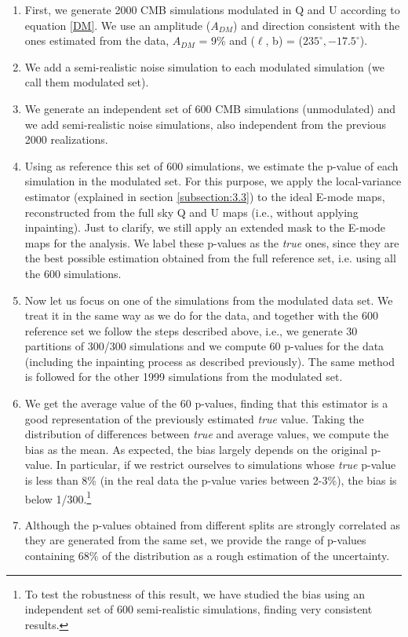 \begin{enumerate}
    \item First, we generate 2000 CMB simulations modulated in Q and U according to equation \ref{DM}. We use an amplitude ($A_{DM}$) and direction consistent with the ones estimated from the data, $A_{DM} $ = 9\% and ($\ell$, b) = ($235^{\circ}, -17.5^{\circ}$).
    \item We add a semi-realistic noise simulation to each modulated simulation (we call them modulated set).
    \item We generate an independent set of 600 CMB simulations (unmodulated) and we add semi-realistic noise simulations, also independent from the previous 2000 realizations.
    \item Using as reference this set of 600 simulations, we estimate the p-value of each simulation in the modulated set. For this purpose, we apply the local-variance estimator (explained in section \ref{subsection:3.3}) to the ideal E-mode maps, reconstructed from the full sky Q and U maps (i.e., without applying inpainting). Just to clarify, we still apply an extended mask to the E-mode maps for the analysis. We label these p-values as the \emph{true} ones, since they are the best possible estimation obtained from the full reference set, i.e. using all the 600 simulations.
    \item Now let us focus on one of the simulations from the modulated data set. We treat it in the same way as we do for the data,
    and together with the 600 reference set we follow the steps described above, i.e., we generate 30 partitions of 300/300 simulations and we compute 60 p-values for the data (including the inpainting process as described previously). The same method is followed for the other 1999 simulations from the modulated set.
    \item We get the average value of the 60 p-values, finding that this estimator is a good representation of the previously estimated \emph{true} value. Taking the distribution of differences between \emph{true} and average values, we %
    compute the bias as the mean.
    As expected, the bias largely depends on the original p-value. In particular, if we restrict ourselves to simulations whose \emph{true} p-value is less than 8\% (in the real data the p-value varies between 2-3\%), the bias is below 1/300.\footnote{To test the robustness of this result, we have studied the bias using an independent set of 600 semi-realistic simulations, finding very consistent results.}
    \item Although the p-values obtained from different splits are strongly correlated as they are generated from the same set, we provide the range of p-values containing 68\% of the distribution as a rough estimation of the uncertainty.
\end{enumerate}

